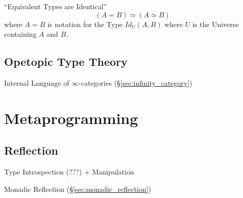 ``Equivalent Types are Identical''
\[
  (A = B) \simeq (A \simeq B)
\]
where $A = B$ is notation for the Type $Id_U(A,B)$ where $U$ is the
Universe containing $A$ and $B$.



\subsection{Opetopic Type Theory}\label{sec:opetopic_typetheory}

Internal Language of $\infty$-categories
(\S\ref{sec:infinity_category})



\section{Metaprogramming}\label{sec:metaprogramming}

\subsection{Reflection}\label{sec:type_reflection}

Type Introspection (???) + Manipulation

Monadic Reflection (\S\ref{sec:monadic_reflection})
